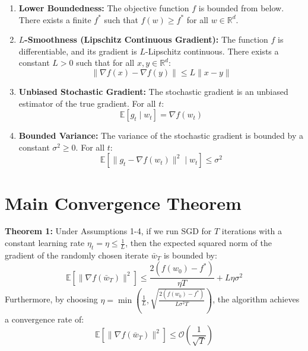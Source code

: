 \documentclass[11pt]{article}
\begin{document}
\begin{enumerate}
    \item \textbf{Lower Boundedness:} The objective function $f$ is bounded from below. There exists a finite $f^*$ such that $f(w) \geq f^*$ for all $w \in \mathbb{R}^d$.
    \item \textbf{$L$-Smoothness (Lipschitz Continuous Gradient):} The function $f$ is differentiable, and its gradient is $L$-Lipschitz continuous. There exists a constant $L > 0$ such that for all $x, y \in \mathbb{R}^d$:
    $$\|\nabla f(x) - \nabla f(y)\| \leq L\|x - y\|$$
    \item \textbf{Unbiased Stochastic Gradient:} The stochastic gradient is an unbiased estimator of the true gradient. For all $t$:
    $$\mathbb{E}[g_t \mid w_t] = \nabla f(w_t)$$
    \item \textbf{Bounded Variance:} The variance of the stochastic gradient is bounded by a constant $\sigma^2 \geq 0$. For all $t$:
    $$\mathbb{E}[\|g_t - \nabla f(w_t)\|^2 \mid w_t] \leq \sigma^2$$
\end{enumerate}

\section*{Main Convergence Theorem}
\textbf{Theorem 1:} Under Assumptions 1-4, if we run SGD for $T$ iterations with a constant learning rate $\eta_t = \eta \leq \frac{1}{L}$, then the expected squared norm of the gradient of the randomly chosen iterate $\bar{w}_T$ is bounded by:
$$ \mathbb{E}[\|\nabla f(\bar{w}_T)\|^2] \leq \frac{2(f(w_0) - f^*)}{\eta T} + L\eta\sigma^2 $$
Furthermore, by choosing $\eta = \min\left(\frac{1}{L}, \sqrt{\frac{2(f(w_0) - f^*)}{L \sigma^2 T}}\right)$, the algorithm achieves a convergence rate of:
$$ \mathbb{E}[\|\nabla f(\bar{w}_T)\|^2] \leq \mathcal{O}\left(\frac{1}{\sqrt{T}}\right) $$
\end{document}
